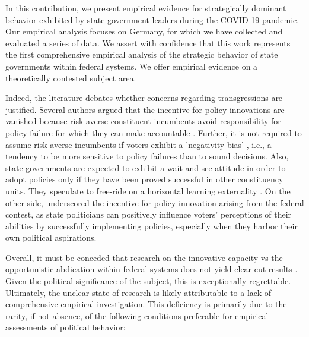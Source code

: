 \documentclass[12pt, abstracton]{scrartcl}
\begin{document}
In this contribution, we present empirical evidence for strategically dominant behavior exhibited by state government leaders during the COVID-19 pandemic. Our empirical analysis focuses on Germany, for which we have collected and evaluated a series of data. We assert with confidence that this work represents the first comprehensive empirical analysis of the strategic behavior of state governments within federal systems. We offer empirical evidence on a theoretically contested subject area.

Indeed, the literature debates whether concerns regarding transgressions are justified. Several authors argued that the incentive for policy innovations are vanished because risk-averse constituent incumbents avoid responsibility for policy failure for which they can make accountable \citep{RoseAckerman1980}. Further, it is not required to assume risk-averse incumbents if voters exhibit a 'negativity bias' \citep{Weaver1986}, i.e., a tendency to be more sensitive to policy failures than to sound decisions. Also, state governments are expected to exhibit a wait-and-see attitude in order to adopt policies only if they have been proved successful in other constituency units. They speculate to free-ride on a horizontal learning externality \citep{Strumpf2002}. On the other side, \cite{KotSchwager2006} underscored the incentive for policy innovation arising from the federal contest, as state politicians can positively influence voters' perceptions of their abilities by successfully implementing policies, especially when they harbor their own political aspirations.

Overall, it must be conceded that research on the innovative capacity vs the opportunistic abdication within federal systems does not yield clear-cut results \citep{Agrawal2022}. Given the political significance of the subject, this is exceptionally regrettable. Ultimately, the unclear state of research is likely attributable to a lack of comprehensive empirical investigation. This deficiency is primarily due to the rarity, if not absence, of the following conditions preferable for empirical assessments of political behavior:
\end{document}
